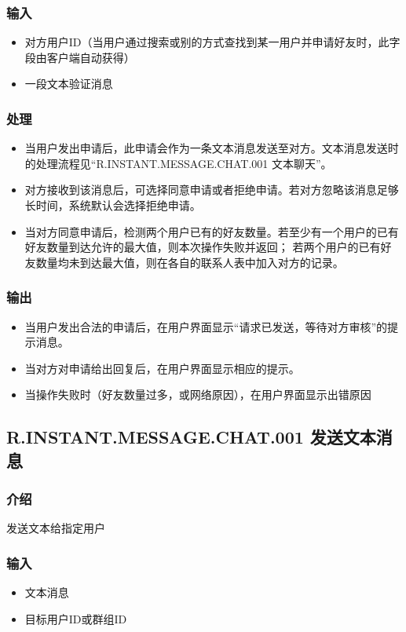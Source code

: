 \subsubsection{输入}
\begin{itemize}
	\item 对方用户ID（当用户通过搜索或别的方式查找到某一用户并申请好友时，此字段由客户端自动获得）
	\item 一段文本验证消息
\end{itemize}
\subsubsection{处理}
\begin{itemize}
	\item 当用户发出申请后，此申请会作为一条文本消息发送至对方。文本消息发送时的处理流程见“R.INSTANT.MESSAGE.CHAT.001 文本聊天”。
	\item 对方接收到该消息后，可选择同意申请或者拒绝申请。若对方忽略该消息足够长时间，系统默认会选择拒绝申请。
	\item 当对方同意申请后，检测两个用户已有的好友数量。若至少有一个用户的已有好友数量到达允许的最大值，则本次操作失败并返回；
	若两个用户的已有好友数量均未到达最大值，则在各自的联系人表中加入对方的记录。
\end{itemize}
\subsubsection{输出}
\begin{itemize}
	\item 当用户发出合法的申请后，在用户界面显示“请求已发送，等待对方审核”的提示消息。
	\item 当对方对申请给出回复后，在用户界面显示相应的提示。
	\item 当操作失败时（好友数量过多，或网络原因），在用户界面显示出错原因
\end{itemize}


\subsection{R.INSTANT.MESSAGE.CHAT.001 发送文本消息}
\subsubsection{介绍}
发送文本给指定用户

\subsubsection{输入}
\begin{itemize}
	\item 文本消息
	\item 目标用户ID或群组ID
\end{itemize}

